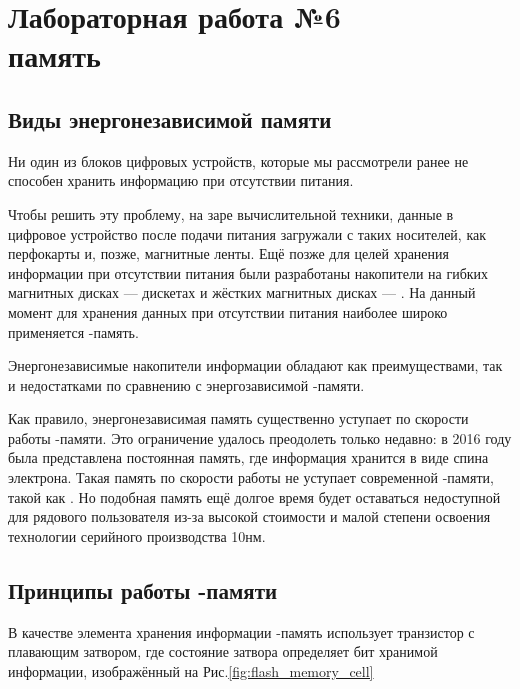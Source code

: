 \chapter{Лабораторная работа №6\\ память} 

\section{Виды энергонезависимой памяти}

\par{Ни один из блоков цифровых устройств, которые мы рассмотрели ранее не способен хранить информацию при отсутствии питания.}

\par{Чтобы решить эту проблему, на заре вычислительной техники, данные в цифровое устройство после подачи питания загружали с таких носителей, как перфокарты и, позже, магнитные ленты. Ещё позже для целей хранения информации при отсутствии питания были разработаны накопители на гибких магнитных дисках --- дискетах и жёстких магнитных дисках --- . На данный момент для хранения данных при отсутствии питания наиболее широко применяется -память.}

\par{Энергонезависимые накопители информации обладают как преимуществами, так и недостатками по сравнению с энергозависимой -памяти.} 

\par{Как правило, энергонезависимая память существенно уступает по скорости работы -памяти. Это ограничение удалось преодолеть только недавно: в 2016 году была представлена постоянная память, где информация хранится в виде спина электрона. Такая память по скорости работы не уступает современной -памяти, такой как . Но подобная память ещё долгое время будет оставаться недоступной для рядового пользователя из-за высокой стоимости и малой степени освоения технологии серийного производства 10нм.}

\section{Принципы работы -памяти}

\par{В качестве элемента хранения информации -память использует транзистор с плавающим затвором, где состояние затвора определяет бит хранимой информации, изображённый на Рис.\ref{fig:flash_memory_cell}}

